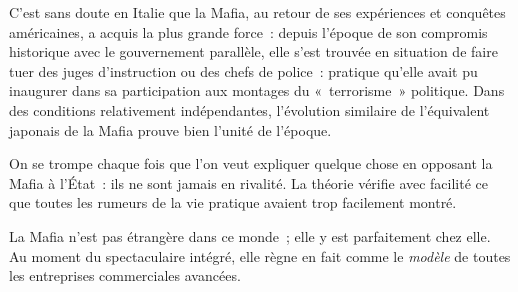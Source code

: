 \documentclass[french,twoside]{book} %
\def\bignobreak{\ifdim\lastskip<\bigskipamount
  \removelastskip\nopagebreak\bigskip\fi}
\newcommand{\labelblock}[1]{\bigbreak{\color{rubric}\noindent\textbf{#1}\par}\bignobreak}
\begin{document}
C’est sans doute en Italie que la Mafia, au retour de ses expériences et conquêtes américaines, a acquis la plus grande force : depuis l’époque de son compromis historique avec le gouvernement parallèle, elle s’est trouvée en situation de faire tuer des juges d’instruction ou des chefs de police : pratique qu’elle avait pu inaugurer dans sa participation aux montages du « terrorisme » politique. Dans des conditions relativement indépendantes, l’évolution similaire de l’équivalent japonais de la Mafia prouve bien l’unité de l’époque.\par
On se trompe chaque fois que l’on veut expliquer quelque chose en opposant la Mafia à l’État : ils ne sont jamais en rivalité. La théorie vérifie avec facilité ce que toutes les rumeurs de la vie pratique avaient trop facilement montré.\par
La Mafia n’est pas étrangère dans ce monde ; elle y est parfaitement chez elle. Au moment du spectaculaire intégré, elle règne en fait comme le \emph{modèle} de toutes les entreprises commerciales avancées.\par

\labelblock{XXV}
\end{document}
